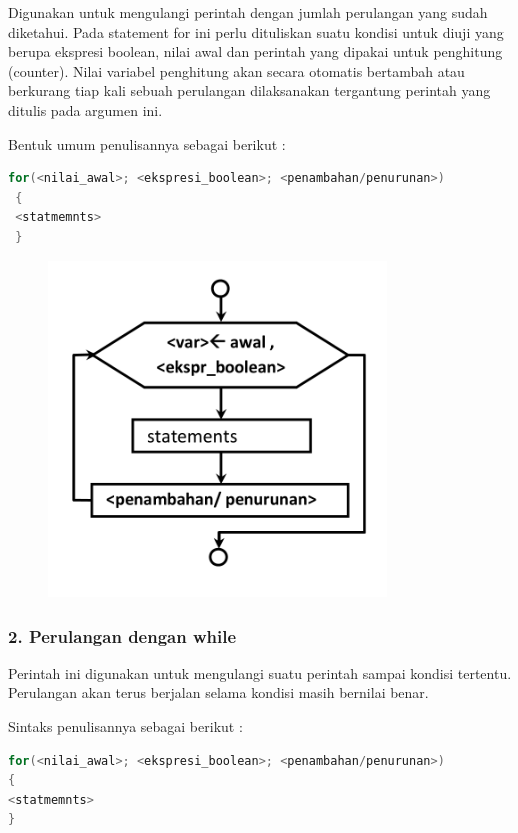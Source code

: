 Digunakan untuk mengulangi perintah dengan jumlah perulangan yang sudah
diketahui. Pada statement for ini perlu dituliskan suatu kondisi untuk
diuji yang berupa ekspresi boolean, nilai awal dan perintah yang dipakai
untuk penghitung (counter). Nilai variabel penghitung akan secara
otomatis bertambah atau berkurang tiap kali sebuah perulangan
dilaksanakan tergantung perintah yang ditulis pada argumen ini.

Bentuk umum penulisannya sebagai berikut :

\begin{lstlisting}[language=c++]
 for(<nilai_awal>; <ekspresi_boolean>; <penambahan/penurunan>)
 {
 <statmemnts>
 }
\end{lstlisting}

\begin{figure}[htbp]
\centering
\includegraphics[width=0.8\textwidth]{images/capture2-8.png}
\caption{}
\end{figure}

\subsubsection{2. Perulangan dengan while}\label{perulangan-dengan-while}

Perintah ini digunakan untuk mengulangi suatu perintah sampai kondisi
tertentu. Perulangan akan terus berjalan selama kondisi masih bernilai
benar.

Sintaks penulisannya sebagai berikut :

\begin{lstlisting}[language=c++]
for(<nilai_awal>; <ekspresi_boolean>; <penambahan/penurunan>)
{
<statmemnts>
}
\end{lstlisting}

